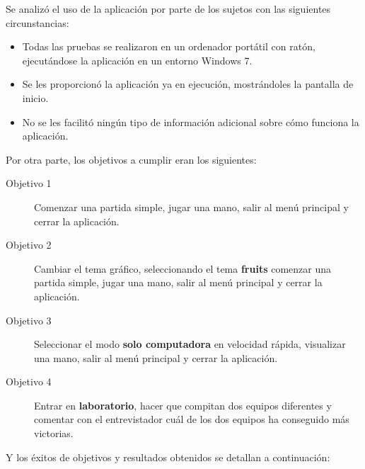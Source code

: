 Se analizó el uso de la aplicación por parte de los sujetos con las siguientes circunstancias:

\begin{itemize}
    \item Todas las pruebas se realizaron en un ordenador portátil con ratón, ejecutándose la aplicación en un entorno Windows 7.
    \item Se les proporcionó la aplicación ya en ejecución, mostrándoles la pantalla de inicio.
    \item No se les facilitó ningún tipo de información adicional sobre cómo funciona la aplicación.
\end{itemize}

Por otra parte, los objetivos a cumplir eran los siguientes:

\begin{description}
    \item[Objetivo 1] Comenzar una partida simple, jugar una mano, salir al menú principal y cerrar la aplicación.
    \item[Objetivo 2] Cambiar el tema gráfico, seleccionando el tema \textbf{fruits} comenzar una partida simple,
            jugar una mano, salir al menú principal y cerrar la aplicación.
    \item[Objetivo 3] Seleccionar el modo \textbf{solo computadora} en velocidad rápida, visualizar una mano, salir
            al menú principal y cerrar la aplicación.
    \item[Objetivo 4] Entrar en \textbf{laboratorio}, hacer que compitan dos equipos diferentes y comentar con el
            entrevistador cuál de los dos equipos ha conseguido más victorias.
\end{description}

Y los éxitos de objetivos y resultados obtenidos se detallan a continuación:

